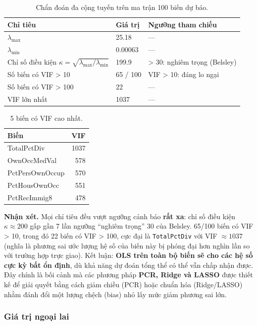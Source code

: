 \begin{longtable}[t]{lll}
\caption{\label{tab:da-cong-tuyen}Chẩn đoán đa cộng tuyến trên ma trận 100 biến dự báo.}\\
\toprule
Chỉ tiêu & Giá trị & Ngưỡng tham chiếu\\
\midrule
$\lambda_{\max}$ & 25.18 & —\\
$\lambda_{\min}$ & 0.00063 & —\\
Chỉ số điều kiện $\kappa = \sqrt{\lambda_{\max}/\lambda_{\min}}$ & 199.9 & > 30: nghiêm trọng (Belsley)\\
Số biến có VIF > 10 & 65 / 100 & VIF > 10: đáng lo ngại\\
Số biến có VIF > 100 & 22 & —\\
\addlinespace
VIF lớn nhất & 1037 & —\\
\bottomrule
\end{longtable}

\begin{longtable}[t]{lr}
\caption{\label{tab:da-cong-tuyen-vif}5 biến có VIF cao nhất.}\\
\toprule
Biến & VIF\\
\midrule
TotalPctDiv & 1037\\
OwnOccMedVal & 578\\
PctPersOwnOccup & 570\\
PctHousOwnOcc & 551\\
PctRecImmig8 & 478\\
\bottomrule
\end{longtable}

\textbf{Nhận xét.} Mọi chỉ tiêu đều vượt ngưỡng cảnh báo \textbf{rất
xa}: chỉ số điều kiện \(\kappa \approx 200\) gấp gần 7 lần ngưỡng
``nghiêm trọng'' 30 của Belsley. 65/100 biến có VIF \textgreater{} 10,
trong đó 22 biến có VIF \textgreater{} 100, cực đại là
\texttt{TotalPctDiv} với VIF \(\approx 1037\) (nghĩa là phương sai ước
lượng hệ số của biến này bị phóng đại hơn nghìn lần so với trường hợp
trực giao). Kết luận: \textbf{OLS trên toàn bộ biến sẽ cho các hệ số cực
kỳ bất ổn định}, dù khả năng dự đoán tổng thể có thể vẫn chấp nhận được.
Đây chính là bối cảnh mà các phương pháp \textbf{PCR, Ridge và LASSO}
được thiết kế để giải quyết bằng cách giảm chiều (PCR) hoặc chuẩn hóa
(Ridge/LASSO) nhằm đánh đổi một lượng chệch (bias) nhỏ lấy mức giảm
phương sai lớn.

\subsubsection{Giá trị ngoại lai}\label{giuxe1-trux1ecb-ngoux1ea1i-lai}

